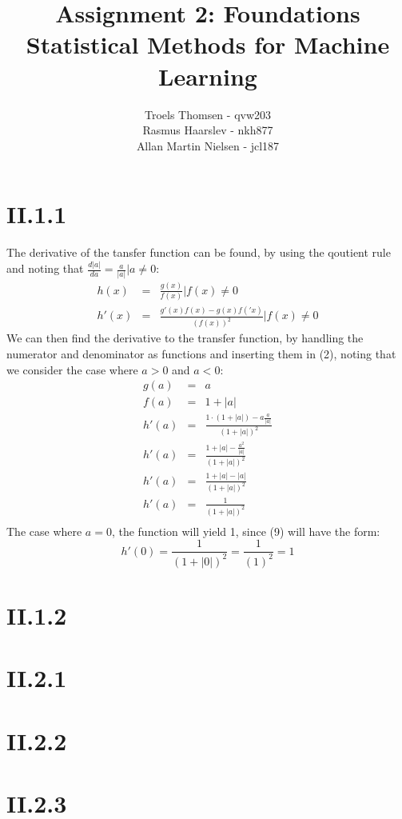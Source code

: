\documentclass[12pt, a4paper]{article}
\title{Assignment 2: Foundations\\Statistical Methods for Machine Learning}
\author{Troels Thomsen - qvw203\\Rasmus Haarslev - nkh877\\Allan Martin Nielsen - jcl187}
\begin{document}
\pagestyle{empty}
\maketitle
{}
\newpage

\tableofcontents
\newpage

\pagestyle{fancy}

\section{II.1.1}
The derivative of the tansfer function can be found, by using the qoutient rule and noting that $\frac{d|a|}{da}=\frac{a}{|a|}|a\neq 0$:\\
\begin{eqnarray}
h(x) &=& \frac{g(x)}{f(x)} | f(x) \neq 0\\
h'(x) &=& \frac{g'(x)f(x)-g(x)f('x)}{(f(x))^2} | f(x) \neq 0
\end{eqnarray} 
We can then find the derivative to the transfer function, by handling the numerator and denominator as functions and inserting them in (2), noting that we consider the case where $a>0$ and $a<0$:
 \begin{eqnarray}
g(a) &=& a\\
f(a) &=& 1+|a|\\
h'(a) &=& \frac{1\cdot (1+|a|)-a\frac{a}{|a|}}{(1+|a|)^2}\\
h'(a) &=& \frac{1+|a|-\frac{a^2}{|a|}}{(1+|a|)^2}\\
h'(a) &=& \frac{1+|a|-|a|}{(1+|a|)^2}\\
h'(a) &=& \frac{1}{(1+|a|)^2}\\
\end{eqnarray}
The case where $a=0$, the function will yield 1, since (9) will have the form:\\
\begin{equation}
h'(0) = \frac{1}{(1+|0|)^2} = \frac{1}{(1)^2} = 1
\end{equation}
\section{II.1.2}
\section{II.2.1}
\section{II.2.2}
\section{II.2.3}
\end{document}
